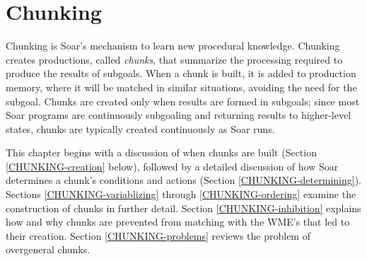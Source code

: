 \chapter{Chunking}
\label{CHUNKING}




Chunking is Soar's mechanism to learn new procedural knowledge.
Chunking creates productions, called \emph{chunks}, that summarize the
processing required to produce the results of subgoals. When a chunk is built,
it is added to production memory, where it will be matched in similar
situations, avoiding the need for the subgoal. Chunks are created only when
results are formed in subgoals; since most Soar programs are continuously
subgoaling and returning results to higher-level states, chunks are typically
created continuously as Soar runs.

This chapter begins with a discussion of when chunks are built (Section
\ref{CHUNKING-creation} below), followed by a detailed discussion of
how Soar determines a chunk's conditions and actions (Section
\ref{CHUNKING-determining}). Sections \ref{CHUNKING-variablizing} through
\ref{CHUNKING-ordering} examine the construction of chunks in further
detail. Section \ref{CHUNKING-inhibition} explains how and why chunks are
prevented from matching with the WME's that led to their creation. Section
\ref{CHUNKING-problems} reviews the problem of overgeneral chunks.



